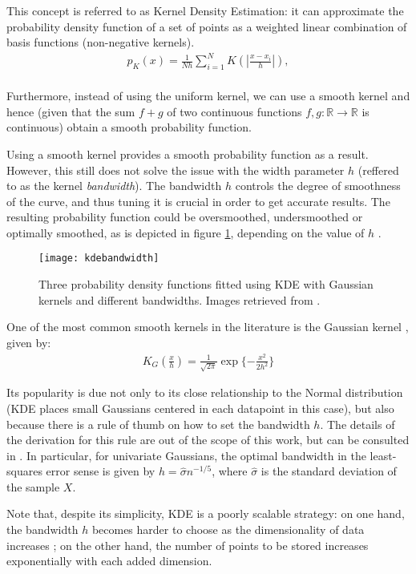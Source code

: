 \documentclass[../main.tex]{subfiles}
\begin{document}
\par This concept is referred to as Kernel Density Estimation: it can approximate the probability density function of a set of points as a weighted linear combination of basis functions (non-negative kernels). 
\begin{align*}
p_K(x) = \frac{1}{Nh}\sum_{i=1}^NK\left(\left|\frac{x - x_i}{h}\right|\right),\\
\end{align*}
\par Furthermore, instead of using the uniform kernel, we can use a smooth kernel and hence (given that the sum $f+g$ of two continuous functions $f, g: \mathbb{R} \rightarrow \mathbb{R}$ is continuous) obtain a smooth probability function. 
\par Using a smooth kernel provides a smooth probability function as a result. However, this still does not solve the issue with the width parameter $h$ (reffered to as the kernel \emph{bandwidth}). The bandwidth $h$ controls the degree of smoothness of the curve, and thus tuning it is crucial in order to get accurate results. The resulting probability function could be oversmoothed, undersmoothed or optimally smoothed, as is depicted in figure \ref{fig_kdebandwidths}, depending on the value of $h$ \cite{Duong2004}.
\begin{figure}[t]
\centering
\texttt{[image: kdebandwidth]}
\caption{Three probability density functions fitted using KDE with Gaussian kernels and different bandwidths. Images retrieved from \cite{Duong2004}.}
\label{fig_kdebandwidths}
\end{figure}
\par One of the most common smooth kernels in the literature is the Gaussian kernel \cite{hastie2008}, given by:
\begin{align*}
K_G\left(\frac{x}{h}\right) = \frac{1}{\sqrt{2\pi}}\exp{\{-\frac{x^2}{2h^2}\}}
\end{align*}
\par Its popularity is due not only to its close relationship to the Normal distribution (KDE places small Gaussians centered in each datapoint in this case), but also because there is a rule of thumb on how to set the bandwidth $h$. The details of the derivation for this rule are out of the scope of this work, but can be consulted in \cite{Hansen2009}. In particular, for univariate Gaussians, the optimal bandwidth in the least-squares error sense is given by $h = \hat{\sigma}n^{-1/5}$, where $\hat{\sigma}$ is the standard deviation of the sample $X$.
\par Note that, despite its simplicity, KDE is a poorly scalable strategy: on one hand, the bandwidth $h$ becomes harder to choose as the dimensionality of data increases \cite{Hansen2009}; on the other hand, the number of points to be stored increases exponentially with each added dimension.
\end{document}
